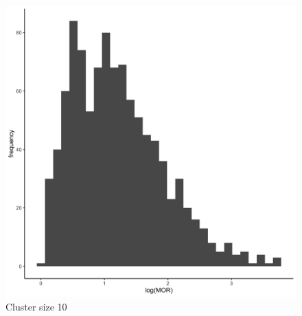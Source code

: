\documentclass[
  letterpaper,
  DIV=11,
  numbers=noendperiod,
  titlepage]{scrartcl}
\begin{document}
\begin{figure}
\begin{minipage}[t]{0.24\linewidth}
{{\includegraphics{../../plots/two-lvl-ran-slope/high-prev/hist_10_10_two_lvl_slp_high_prev_q1.png}

}

\caption{Cluster size 10}

}

\end{minipage}%
%
\begin{minipage}[t]{0.24\linewidth}

{\centering 

}
\end{minipage}
\end{figure}
\end{document}
